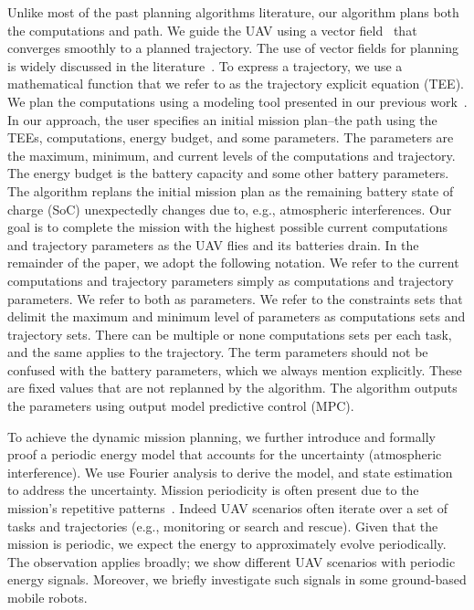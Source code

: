 \documentclass[letterpaper,10pt,conference]{ieeeconf}
\theoremstyle{definition}
\begin{document}
Unlike most of the past planning algorithms literature, our algorithm plans both the computations and path. We guide the UAV using a vector field~\cite{de2017guidance} that converges smoothly to a planned trajectory. The use of vector fields for planning is widely discussed in the literature~\cite{lindemann2005smoothly,gonccalves2010vector,panagou2014motion,zhou2014vector,kapitanyuk2017guiding}. To express a trajectory, we use a mathematical function that we refer to as the trajectory explicit equation (TEE). We plan the computations using a modeling tool presented in our previous work~\cite{seewald2019coarse}. In our approach, the user specifies an initial mission plan--the path using the TEEs, computations, energy budget, and some parameters. The parameters are the maximum, minimum, and current levels of the computations and trajectory. The energy budget is the battery capacity and some other battery parameters. The algorithm replans the initial mission plan as the remaining battery state of charge (SoC) unexpectedly changes due to, e.g., atmospheric interferences. Our goal is to complete the mission with the highest possible current computations and trajectory parameters as the UAV flies and its batteries drain. In the remainder of the paper, we adopt the following notation. We refer to the current computations and trajectory parameters simply as computations and trajectory parameters. We refer to both as parameters. We refer to the constraints sets that delimit the maximum and minimum level of parameters as computations sets and trajectory sets. There can be multiple or none computations sets per each task, and the same applies to the trajectory. The term parameters should not be confused with the battery parameters, which we always mention explicitly. These are fixed values that are not replanned by the algorithm. The algorithm outputs the parameters using output model predictive control (MPC).

To achieve the dynamic mission planning, we further introduce and formally proof a periodic energy model that accounts for the uncertainty (atmospheric interference). We use Fourier analysis to derive the model, and state estimation to address the uncertainty. Mission periodicity is often present due to the mission's repetitive patterns~\cite{seewald2020mechanical}. Indeed UAV scenarios often iterate over a set of tasks and trajectories (e.g., monitoring or search and rescue). Given that the mission is periodic, we expect the energy to approximately evolve periodically. 
The observation applies broadly; we show different UAV scenarios with periodic energy signals. Moreover, we briefly investigate such signals in some ground-based mobile robots.
\end{document}

